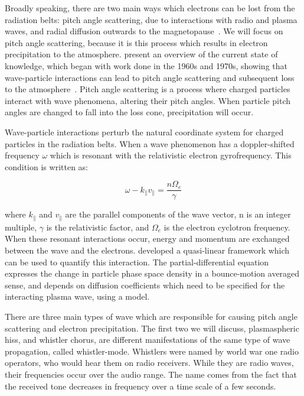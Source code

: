 Broadly speaking, there are two main ways which electrons can be lost from the radiation belts: pitch angle scattering, due to interactions with radio and plasma waves, and radial diffusion outwards to the magnetopause~\citep{cao2017}. We will focus on pitch angle scattering, because it is this process which results in electron precipitation to the atmosphere. \cite{Millan2007a} present an overview of the current state of knowledge, which began with work done in the 1960s and 1970s, showing that wave-particle interactions can lead to pitch angle scattering and subsequent loss to the atmosphere~\citep{kennel1966, thorne1971, thorne1974}. Pitch angle scattering is a process where charged particles interact with wave phenomena, altering their pitch angles. When particle pitch angles are changed to fall into the loss cone, precipitation will occur. 

Wave-particle interactions perturb the natural coordinate system for charged particles in the radiation belts. When a wave phenomenon has a doppler-shifted frequency $\omega$ which is resonant with the relativistic electron gyrofrequency. This condition is written as:

$$\omega - k_{\parallel}v_{\parallel} = \frac{n\Omega_e}{\gamma}$$

where $k_{\parallel}$ and $v_{\parallel}$ are the parallel components of the wave vector, n is an integer multiple, $\gamma$ is the relativistic factor, and $\Omega_e$ is the electron cyclotron frequency. When these resonant interactions occur, energy and momentum are exchanged between the wave and the electrons. \cite{schulz1974} developed a quasi-linear framework which can be used to quantify this interaction. The partial-differential equation expresses the change in particle phase space density in a bounce-motion averaged sense, and depends on diffusion coefficients which need to be specified for the interacting plasma wave, using a model. 

There are three main types of wave which are responsible for causing pitch angle scattering and electron precipitation. The first two we will discuss, plasmaspheric hiss, and whistler chorus, are different manifestations of the same type of wave propagation, called whistler-mode. Whistlers were named by world war one radio operators, who would hear them on radio receivers. While they are radio waves, their frequencies occur over the audio range. The name comes from the fact that the received tone decreases in frequency over a time scale of a few seconds. 

